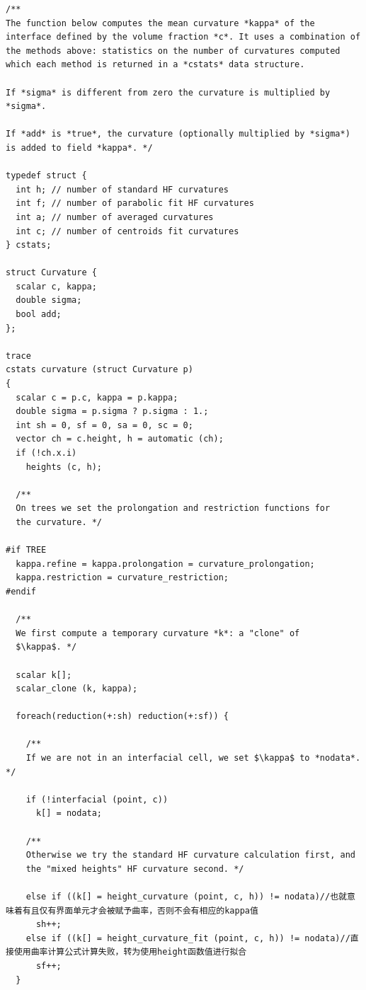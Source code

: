 \documentclass[lang=cn,11pt,a4paper]{elegantpaper}
\begin{document}
\begin{verbatim}
/**
The function below computes the mean curvature *kappa* of the
interface defined by the volume fraction *c*. It uses a combination of
the methods above: statistics on the number of curvatures computed
which each method is returned in a *cstats* data structure. 

If *sigma* is different from zero the curvature is multiplied by *sigma*.

If *add* is *true*, the curvature (optionally multiplied by *sigma*)
is added to field *kappa*. */

typedef struct {
  int h; // number of standard HF curvatures
  int f; // number of parabolic fit HF curvatures
  int a; // number of averaged curvatures
  int c; // number of centroids fit curvatures
} cstats;

struct Curvature {
  scalar c, kappa;
  double sigma;
  bool add;
};

trace
cstats curvature (struct Curvature p)
{
  scalar c = p.c, kappa = p.kappa;
  double sigma = p.sigma ? p.sigma : 1.;
  int sh = 0, sf = 0, sa = 0, sc = 0;
  vector ch = c.height, h = automatic (ch);
  if (!ch.x.i)
    heights (c, h);

  /**
  On trees we set the prolongation and restriction functions for
  the curvature. */
  
#if TREE
  kappa.refine = kappa.prolongation = curvature_prolongation;
  kappa.restriction = curvature_restriction;
#endif

  /**
  We first compute a temporary curvature *k*: a "clone" of
  $\kappa$. */
  
  scalar k[];
  scalar_clone (k, kappa);

  foreach(reduction(+:sh) reduction(+:sf)) {

    /**
    If we are not in an interfacial cell, we set $\kappa$ to *nodata*. */

    if (!interfacial (point, c))
      k[] = nodata;

    /**
    Otherwise we try the standard HF curvature calculation first, and
    the "mixed heights" HF curvature second. */ 
    
    else if ((k[] = height_curvature (point, c, h)) != nodata)//也就意味着有且仅有界面单元才会被赋予曲率，否则不会有相应的kappa值
      sh++;
    else if ((k[] = height_curvature_fit (point, c, h)) != nodata)//直接使用曲率计算公式计算失败，转为使用height函数值进行拟合
      sf++;
  }
  

\end{verbatim}
\end{document}
